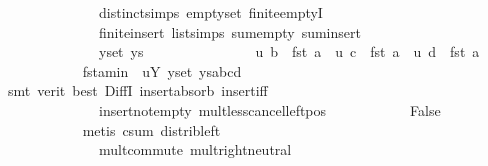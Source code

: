 \begin{isabellebody}
\ \ \ \ \ \ \ \ \ \ \ \ \ \ distinct{\isachardot}{\kern0pt}simps{\isacharparenleft}{\kern0pt}{}{\isacharparenright}{\kern0pt}\ empty{\isacharunderscore}{\kern0pt}set\ finite{\isachardot}{\kern0pt}emptyI\isanewline
\ \ \ \ \ \ \ \ \ \ \ \ \ \ finite{\isacharunderscore}{\kern0pt}insert\ list{\isachardot}{\kern0pt}simps{\isacharparenleft}{\kern0pt}{}{}{\isacharparenright}{\kern0pt}\ sum{\isachardot}{\kern0pt}empty\ sum{\isachardot}{\kern0pt}insert\isanewline
\ \ \ \ \ \ \ \ \ \ \ \ \ \ y{\isacharunderscore}{\kern0pt}set\ ys{\isacharparenright}{\kern0pt}\isanewline
\ \ \ \ \ \ \ \ \isamarkupfalse%
\ \isamarkupfalse%
\ {\isachardoublequoteopen}\ {\isachardot}{\kern0pt}{\isachardot}{\kern0pt}{\isachardot}{\kern0pt}\ {\isachargreater}{\kern0pt}\ \ u\ b\ {\isacharasterisk}{\kern0pt}\ {\isacharparenleft}{\kern0pt}fst\ a{\isacharparenright}{\kern0pt}\ {\isacharplus}{\kern0pt}\ u\ c\ {\isacharasterisk}{\kern0pt}\ {\isacharparenleft}{\kern0pt}fst\ a{\isacharparenright}{\kern0pt}\ {\isacharplus}{\kern0pt}\ u\ d\ {\isacharasterisk}{\kern0pt}\ {\isacharparenleft}{\kern0pt}fst\ a{\isacharparenright}{\kern0pt}{\isachardoublequoteclose}\ \isanewline
\ \ \ \ \ \ \ \ \ \ \isamarkupfalse%
\ fst{\isacharunderscore}{\kern0pt}a{\isacharunderscore}{\kern0pt}min\ {\isachardoublequoteopen}{}{}{\isachardoublequoteclose}\ uY{\isacharparenleft}{\kern0pt}{}{\isacharparenright}{\kern0pt}\ y{\isacharunderscore}{\kern0pt}set\ ys{\isacharunderscore}{\kern0pt}abcd\isanewline
\ \ \ \ \ \ \ \ \ \ \isamarkupfalse%
\ {\isacharparenleft}{\kern0pt}smt\ {\isacharparenleft}{\kern0pt}verit{\isacharcomma}{\kern0pt}\ best{\isacharparenright}{\kern0pt}\ DiffI\ insert{\isacharunderscore}{\kern0pt}absorb\ insert{\isacharunderscore}{\kern0pt}iff\isanewline
\ \ \ \ \ \ \ \ \ \ \ \ \ \ insert{\isacharunderscore}{\kern0pt}not{\isacharunderscore}{\kern0pt}empty\ mult{\isacharunderscore}{\kern0pt}less{\isacharunderscore}{\kern0pt}cancel{\isacharunderscore}{\kern0pt}left{\isacharunderscore}{\kern0pt}pos{\isacharparenright}{\kern0pt}\isanewline
\ \ \ \ \ \ \ \ \isamarkupfalse%
\ \isamarkupfalse%
\ False\isanewline
\ \ \ \ \ \ \ \ \ \ \isamarkupfalse%
\ {\isacharparenleft}{\kern0pt}metis\ c{\isacharunderscore}{\kern0pt}sum\ distrib{\isacharunderscore}{\kern0pt}left\isanewline
\ \ \ \ \ \ \ \ \ \ \ \ \ \ mult{\isachardot}{\kern0pt}commute\ mult{\isachardot}{\kern0pt}right{\isacharunderscore}{\kern0pt}neutral\isanewline

\end{isabellebody}
